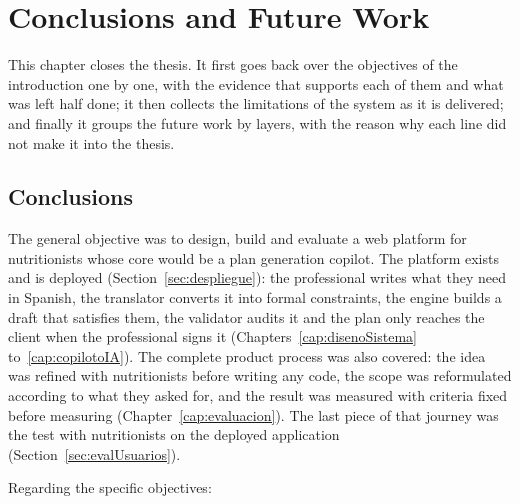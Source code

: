 \chapter*{Conclusions and Future Work}
\label{cap:conclusions}


This chapter closes the thesis. It first goes back over the objectives of the introduction one by one, with the evidence that supports each of them and what was left half done; it then collects the limitations of the system as it is delivered; and finally it groups the future work by layers, with the reason why each line did not make it into the thesis.

\section*{Conclusions}
\label{sec:conclusionsObjectives}

The general objective was to design, build and evaluate a web platform for nutritionists whose core would be a plan generation copilot. The platform exists and is deployed (Section~\ref{sec:despliegue}): the professional writes what they need in Spanish, the translator converts it into formal constraints, the engine builds a draft that satisfies them, the validator audits it and the plan only reaches the client when the professional signs it (Chapters~\ref{cap:disenoSistema} to~\ref{cap:copilotoIA}). The complete product process was also covered: the idea was refined with nutritionists before writing any code, the scope was reformulated according to what they asked for, and the result was measured with criteria fixed before measuring (Chapter~\ref{cap:evaluacion}). The last piece of that journey was the test with nutritionists on the deployed application (Section~\ref{sec:evalUsuarios}).

Regarding the specific objectives:

